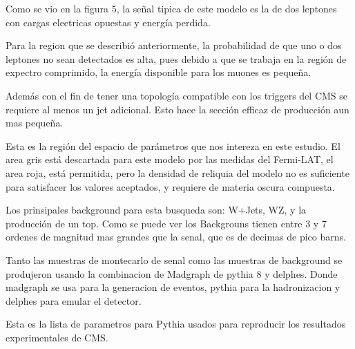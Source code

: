 \documentclass[12pt,letterpaper]{article}
\newcounter{example}[enumi]
\begin{document}
	\begin{tcolorbox}[title= Slide \arabic{example} ]
	Como se vio en la figura 5, la señal tipica de este modelo es la de dos leptones con cargas electricas opuestas y energía perdida.
	
	Para la region que se describió anteriormente, la probabilidad de que uno o dos leptones no sean detectados es alta, pues debido a que se trabaja en la región de expectro comprimido, la energía disponible para los muones es pequeña.
	
	Además con el fin de tener una topología compatible con los triggers del CMS se requiere al menos un jet adicional. Esto hace la sección efficaz de producción aun mas pequeña.
	\end{tcolorbox}
	
	\begin{tcolorbox}[title= Slide \arabic{example} ] %
	Esta es la región del espacio de parámetros que nos intereza en este estudio. El area gris está descartada para este modelo por las medidas del Fermi-LAT, el area roja, está permitida, pero la densidad de reliquia del modelo no es suficiente para satisfacer los valores aceptados, y requiere de materia oscura compuesta.
	\end{tcolorbox}
	
	\begin{tcolorbox}[title= Slide \arabic{example} ]
	Los prinsipales background para esta busqueda son: W+Jets, WZ, y la producción de un top. Como se puede ver los Backgrouns tienen entre 3 y 7 ordenes de magnitud mas grandes que la senal, que es de decimas de pico barns. 
	
	\end{tcolorbox}
	
	\begin{tcolorbox}[title= Slide \arabic{example} ]
	Tanto las muestras de montecarlo de senal como las muestras de background se produjeron usando la combinacion de Madgraph de pythia 8 y delphes.
	Donde madgraph se usa para la generacion de eventos, pythia para la hadronizacion y delphes para emular el detector.
	\end{tcolorbox}
	
	\begin{tcolorbox}[title= Slide \arabic{example} ]
	Esta es la lista de parametros para Pythia usados para reproducir los resultados experimentales de CMS.
	\end{tcolorbox}
	
\end{document}
